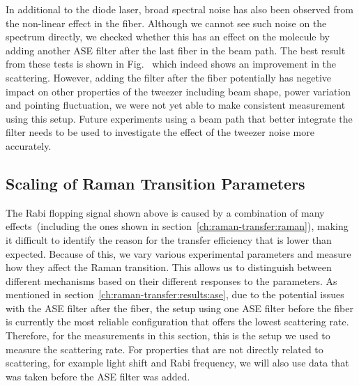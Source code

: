 In additional to the diode laser, broad spectral noise has also been observed
from the non-linear effect in the fiber.
Although we cannot see such noise on the spectrum directly,
we checked whether this has an effect on the molecule by adding another ASE filter after
the last fiber in the beam path.
The best result from these tests is shown in Fig.~
which indeed shows an improvement in the scattering.
However, adding the filter after the fiber potentially has negetive impact
on other properties of the tweezer including beam shape,
power variation and pointing fluctuation,
we were not yet able to make consistent measurement using this setup.
Future experiments using a beam path that better integrate the filter
needs to be used to investigate the effect of the tweezer noise more accurately.

\subsection{Scaling of Raman Transition Parameters}
\label{ch:raman-transfer:results:scaling}

The Rabi flopping signal shown above is caused by a combination of
many effects~(including the ones shown in section~\ref{ch:raman-transfer:raman}),
making it difficult to identify the reason for the transfer efficiency
that is lower than expected.
Because of this, we vary various experimental parameters
and measure how they affect the Raman transition.
This allows us to distinguish between different mechanisms based
on their different responses to the parameters.
As mentioned in section~\ref{ch:raman-transfer:results:ase},
due to the potential issues with the ASE filter after the fiber,
the setup using one ASE filter before the fiber is currently the most reliable configuration
that offers the lowest scattering rate.
Therefore, for the measurements in this section,
this is the setup we used to measure the scattering rate.
For properties that are not directly related to scattering,
for example light shift and Rabi frequency,
we will also use data that was taken before the ASE filter was added.

